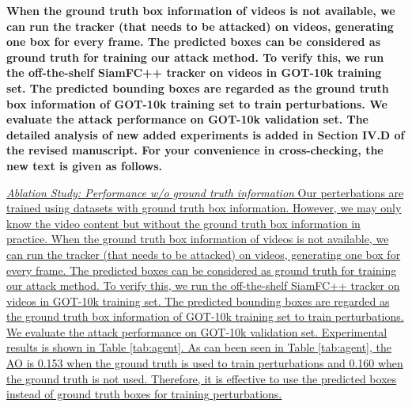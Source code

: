 \documentclass[12pt]{article}
\begin{document}
\textbf{
When the ground truth box information of videos is not available, we can run the tracker (that needs to be attacked) on videos, generating one box for every frame. The predicted boxes can be considered as ground truth for training our attack method.
To verify this, we run the off-the-shelf SiamFC++ tracker on videos in GOT-10k training set. The predicted bounding boxes are regarded as the ground truth box information of GOT-10k training set to train perturbations. We evaluate the attack performance on GOT-10k validation set.
The detailed analysis of new added experiments is added in Section IV.D of the revised manuscript. For your convenience in cross-checking, the new text is given as follows.}

\uline{\textit{Ablation Study: Performance w/o ground truth information} Our perterbations are trained using datasets with ground truth box information.
However, we may only know the video content but without the ground truth box information in practice. When the ground truth box information of videos is not available, we can run the tracker (that needs to be attacked) on videos, generating one box for every frame. The predicted boxes can be considered as ground truth for training our attack method. To verify this, we run the off-the-shelf SiamFC++ tracker on videos in GOT-10k training set. The predicted bounding boxes are regarded as the ground truth box information of GOT-10k training set to train perturbations. We evaluate the attack performance on GOT-10k validation set. Experimental results is shown in Table \ref{tab:agent}. 
As can been seen in Table \ref{tab:agent}, the AO is 0.153 when the ground truth is used to train perturbations and 0.160 when the ground truth is not used.
Therefore, it is effective to use the predicted boxes instead of ground truth boxes for training perturbations.
}
\end{document}
